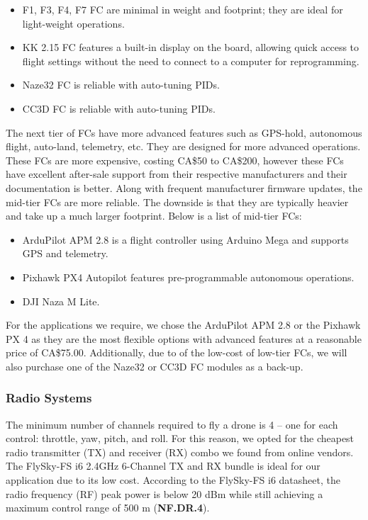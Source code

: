 \begin{itemize}[noitemsep,topsep=0pt, parsep=4pt, partopsep=0pt]
    \item F1, F3, F4, F7 FC are minimal in weight and footprint; they are ideal for light-weight operations.\cite{f1fc}
    \item KK 2.15 FC features a built-in display on the board, allowing quick access to flight settings without the need to connect to a computer for reprogramming.
    \item Naze32 FC is reliable with auto-tuning PIDs.
    \item CC3D FC is reliable with auto-tuning PIDs.
\end{itemize}

The next tier of FCs have more advanced features such as GPS-hold, autonomous flight, auto-land, telemetry, etc. They are designed for more advanced operations. These FCs are more expensive, costing CA\$50 to CA\$200, however these FCs have excellent after-sale support from their respective 
manufacturers and their documentation is better. Along 
with frequent manufacturer firmware updates, the mid-tier FCs are more reliable. The downside is that 
they are typically heavier and take up a much larger footprint. 
Below is a list of mid-tier FCs:

\begin{itemize}[noitemsep,topsep=0pt, parsep=4pt, partopsep=0pt]
    \item ArduPilot APM 2.8 is a flight controller using Arduino Mega and supports GPS and telemetry.
    \item Pixhawk PX4 Autopilot features pre-programmable autonomous operations.
    \item DJI Naza M Lite.
\end{itemize}

For the applications we require, we chose the ArduPilot APM 2.8 or the Pixhawk PX 4 as they are the most flexible options with advanced features at a reasonable price of CA\$75.00. Additionally, due to of the low-cost of low-tier FCs, we will also purchase one of the Naze32 or CC3D FC modules as a back-up.

\subsubsection{Radio Systems}

The minimum number of channels required to fly a drone is 4 -- one for each control: throttle, yaw, 
pitch, and roll. For this reason, we opted for the cheapest radio transmitter (TX) and receiver  (RX) 
combo we found from online vendors. 
The FlySky-FS i6 2.4GHz 6-Channel TX and RX bundle is ideal for our application due to its low cost.
According to the FlySky-FS i6 datasheet\cite{flyskyi6}, the radio frequency (RF) peak power is below 20 dBm while still achieving a maximum control range of 500 m (\textbf{NF.DR.4}).

